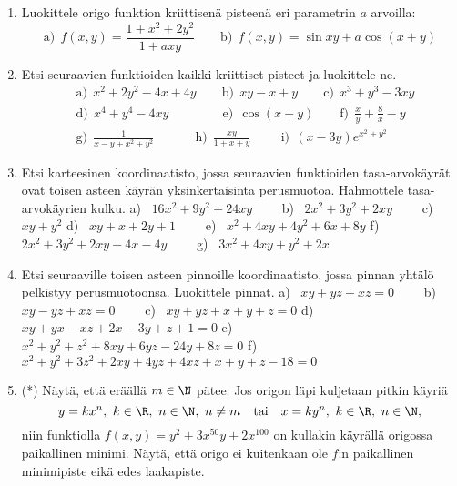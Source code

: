 \begin{enumerate}
\item
Luokittele origo funktion kriittisenä pisteenä eri parametrin $a$ arvoilla:
\[
\text{a)}\ \ f(x,y)= \frac{1+x^2+2y^2}{1+axy} \qquad
\text{b)}\ \ f(x,y)= \sin xy +a\cos(x+y)
\]

\item
Etsi seuraavien funktioiden kaikki kriittiset pisteet ja luokittele ne.
\begin{align*}
&\text{a)}\ \ x^2+2y^2-4x+4y \qquad
 \text{b)}\ \ xy-x+y \qquad
 \text{c)}\ \ x^3+y^3-3xy \\[2mm]
&\text{d)}\ \ x^4+y^4-4xy \qquad\qquad\ 
 \text{e)}\ \ \cos(x+y) \qquad
 \text{f)}\ \ \frac{x}{y}+\frac{8}{x}-y \\ 
&\text{g)}\ \ \frac{1}{x-y+x^2+y^2} \qquad\quad\
 \text{h)}\ \ \frac{xy}{1+x+y} \qquad\,\
 \text{i)}\ \ (x-3y)e^{x^2+y^2}
\end{align*}
 
\item
Etsi karteesinen koordinaatisto, jossa seuraavien funktioiden tasa-arvokäyrät ovat toisen
asteen käyrän yksinkertaisinta perusmuotoa. Hahmottele tasa-arvokäyrien kulku.
\vspace{1mm}\newline
a) \ $16x^2+9y^2+24xy \qquad$
b) \ $2x^2+3y^2+2xy \qquad$
c) \ $xy+y^2$ \newline
d) \ $xy+x+2y+1 \qquad$
e) \ $x^2+4xy+4y^2+6x+8y$ \newline
f) \ $2x^2+3y^2+2xy-4x-4y \qquad$
g) \ $3x^2+4xy+y^2+2x$

\item
Etsi seuraaville toisen asteen pinnoille koordinaatisto, jossa pinnan yhtälö pelkistyy
perusmuotoonsa. Luokittele pinnat. \vspace{1mm}\newline
a) \ $xy+yz+xz=0 \qquad$
b) \ $xy-yz+xz=0 \qquad$
c) \ $xy+yz+x+y+z=0$ \newline
d) \ $xy+yx-xz+2x-3y+z+1=0$ \newline
e) \ $x^2+y^2+z^2+8xy+6yz-24y+8z=0$ \newline
f) \ $x^2+y^2+3z^2+2xy+4yz+4xz+x+y+z-18=0$ 

\item (*)
Näytä, että eräällä $m\in\N$ pätee: Jos origon läpi kuljetaan pitkin käyriä
\[
y=kx^n,\ k\in\R,\ n\in\N,\ n \neq m \quad \text{tai} \quad x=ky^n,\ k\in\R,\ n\in\N,
\]
niin funktiolla $f(x,y)=y^2+3x^{50}y+2x^{100}$ on kullakin käyrällä origossa paikallinen minimi.
Näytä, että origo ei kuitenkaan ole $f$:n paikallinen minimipiste eikä edes laakapiste.


\end{enumerate}
